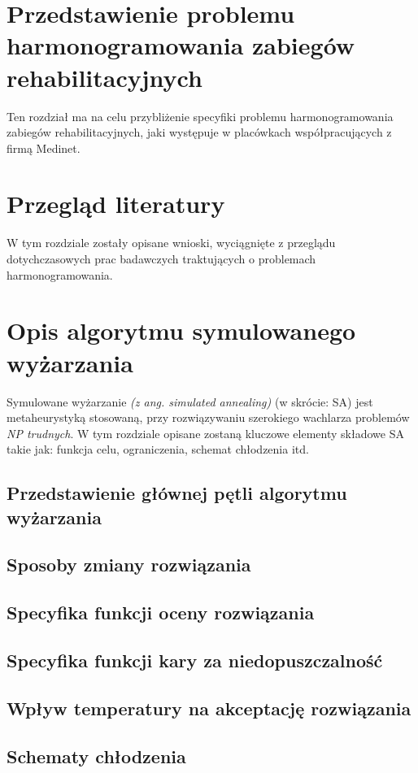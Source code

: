 


\chapter{Przedstawienie problemu harmonogramowania zabiegów rehabilitacyjnych}
Ten rozdział ma na celu przybliżenie specyfiki problemu harmonogramowania zabiegów
rehabilitacyjnych, jaki występuje w placówkach współpracujących z firmą Medinet.

\chapter{Przegląd literatury}
W tym rozdziale zostały opisane wnioski, wyciągnięte z przeglądu dotychczasowych
prac badawczych traktujących o problemach harmonogramowania.

\chapter{Opis algorytmu symulowanego wyżarzania} \label{chapter:sa-desc}
Symulowane wyżarzanie \cite{metaheuristic-handbook} \emph{(z ang. simulated annealing)} (w skrócie: SA) jest metaheurystyką stosowaną, przy rozwiązywaniu szerokiego wachlarza problemów \emph{NP trudnych}. W tym rozdziale opisane zostaną kluczowe elementy składowe SA takie jak: funkcja celu, ograniczenia, schemat chłodzenia itd.

\section{Przedstawienie głównej pętli algorytmu wyżarzania}
\section{Sposoby zmiany rozwiązania} 
\section{Specyfika funkcji oceny rozwiązania}
\section{Specyfika funkcji kary za niedopuszczalność}
\section{Wpływ temperatury na akceptację rozwiązania}
\section{Schematy chłodzenia}


